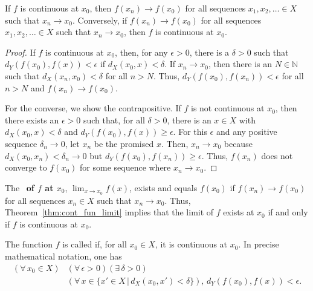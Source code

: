 \begin{theorem} \label{thm:cont_fun_limit}
If $f$ is continuous at $x_0$, then $f(x_n) \to f(x_0)$ for all sequences $x_1,x_2,\ldots \in X$ such that $x_n \to x_0$.
Conversely, if $f(x_n) \to f(x_0)$ for all sequences $x_1,x_2,\ldots  \in X$ such that $x_n \to x_0$, then $f$ is continuous at $x_0$.
\end{theorem}
\begin{proof}
If $f$ is continuous at $x_0$, then, for any $\epsilon > 0$, there is a $\delta >0$ such that $d_Y (f(x_0),f(x)) < \epsilon$ if $d_X (x_0,x) < \delta$.
If $x_n \to x_0$, then there is an $N\in \mathbb{N}$ such that $d_X (x_n,x_0) < \delta$ for all $n>N$.
Thus, $d_Y (f(x_0),f(x_n)) < \epsilon$ for all $n>N$ and $f(x_n) \to f(x_0)$.

For the converse, we show the contrapositive.
If $f$ is not continuous at $x_0$, then there exists an $\epsilon >0$ such that, for all $\delta >0$, there is an $x\in X$ with $d_X (x_0,x) < \delta$ and $d_Y (f(x_0),f(x))\geq \epsilon$.
For this $\epsilon$ and any positive sequence $\delta_n \to 0$, let $x_n$ be the promised $x$.
Then, $x_n \to x_0$ because $d_X (x_0,x_n)<\delta_n \to 0$ but $d_Y (f(x_0),f(x_n))\geq \epsilon$.
Thus, $f(x_n)$ does not converge to $f(x_0)$ for some sequence where $x_n \to x_0$.
\end{proof}

\begin{definition}
\boldmath
The ~\textbf{of $f$ at $x_0$},
\unboldmath
$\lim_{x \to x_0} f(x)$, exists and equals $f(x_0)$ if $f(x_n) \to f(x_0)$ for all sequences $x_n \in X$ such that $x_n \to x_0$.
Thus, Theorem~\ref{thm:cont_fun_limit} implies that the limit of $f$ exists at $x_0$ if and only if $f$ is continuous at $x_0$.
\end{definition}

\begin{definition}
The function $f$ is called  if, for all $x_0 \in X$, it is continuous at $x_0$.
In precise mathematical notation, one has
\begin{equation*}
\begin{split}
(\forall \, x_0 \in X) & (\forall \, \epsilon >0) ( \exists \, \delta >0) \\ & (\forall \, x \in \{x'\in X\,|\,d_X (x_0,x')<\delta\}), \,
  d_Y \left( f(x_0),f(x) \right) < \epsilon .
\end{split}
\end{equation*}
\end{definition}

